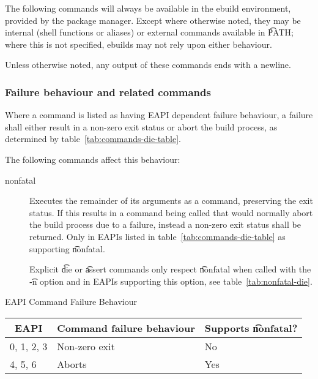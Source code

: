 \label{sec:pkg-mgr-commands}

The following commands will always be available in the ebuild environment, provided by the package
manager. Except where otherwise noted, they may be internal (shell functions or aliases) or external
commands available in \t{PATH}; where this is not specified, ebuilds may not rely upon either
behaviour.

Unless otherwise noted, any output of these commands ends with a newline.

\subsubsection{Failure behaviour and related commands}
\label{sec:failure-behaviour}

 Where a command is listed as having EAPI dependent failure behaviour,
a failure shall either result in a non-zero exit status or abort the build process, as determined by
table~\ref{tab:commands-die-table}.

The following commands affect this behaviour:
\begin{description}
\item[nonfatal]  Executes the remainder of its arguments as a command,
    preserving the exit status. If this results in a command being called that would normally abort
    the build process due to a failure, instead a non-zero exit status shall be returned. Only in
    EAPIs listed in table~\ref{tab:commands-die-table} as supporting \t{nonfatal}.

    Explicit \t{die} or \t{assert} commands only respect \t{nonfatal} when called with the \t{-n}
    option and in EAPIs supporting this option, see table~\ref{tab:nonfatal-die}.
\end{description}

\begin{centertable}{EAPI Command Failure Behaviour}
    \label{tab:commands-die-table}
    \begin{tabular}{lll}
      \toprule
      \multicolumn{1}{c}{\textbf{EAPI}} &
      \multicolumn{1}{c}{\textbf{Command failure behaviour}} &
      \multicolumn{1}{c}{\textbf{Supports \t{nonfatal}?}} \\
      \midrule
      0, 1, 2, 3        & Non-zero exit & No  \\
      4, 5, 6           & Aborts        & Yes \\
      \bottomrule
    \end{tabular}
\end{centertable}

